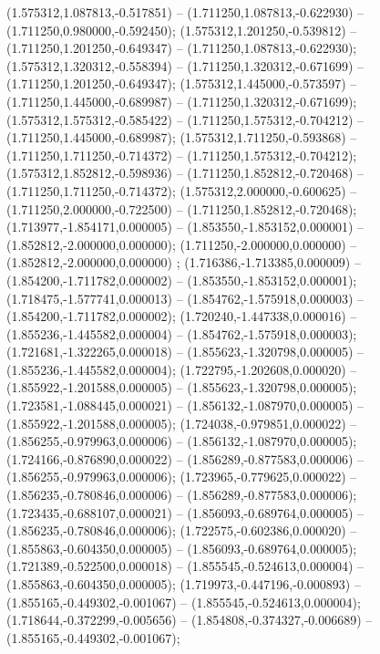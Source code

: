  (1.575312,1.087813,-0.517851) -- (1.711250,1.087813,-0.622930) -- (1.711250,0.980000,-0.592450);
 (1.575312,1.201250,-0.539812) -- (1.711250,1.201250,-0.649347) -- (1.711250,1.087813,-0.622930);
 (1.575312,1.320312,-0.558394) -- (1.711250,1.320312,-0.671699) -- (1.711250,1.201250,-0.649347);
 (1.575312,1.445000,-0.573597) -- (1.711250,1.445000,-0.689987) -- (1.711250,1.320312,-0.671699);
 (1.575312,1.575312,-0.585422) -- (1.711250,1.575312,-0.704212) -- (1.711250,1.445000,-0.689987);
 (1.575312,1.711250,-0.593868) -- (1.711250,1.711250,-0.714372) -- (1.711250,1.575312,-0.704212);
 (1.575312,1.852812,-0.598936) -- (1.711250,1.852812,-0.720468) -- (1.711250,1.711250,-0.714372);
 (1.575312,2.000000,-0.600625) -- (1.711250,2.000000,-0.722500) -- (1.711250,1.852812,-0.720468);
 (1.713977,-1.854171,0.000005) -- (1.853550,-1.853152,0.000001) -- (1.852812,-2.000000,0.000000);
 (1.711250,-2.000000,0.000000) -- (1.852812,-2.000000,0.000000) ;
 (1.716386,-1.713385,0.000009) -- (1.854200,-1.711782,0.000002) -- (1.853550,-1.853152,0.000001);
 (1.718475,-1.577741,0.000013) -- (1.854762,-1.575918,0.000003) -- (1.854200,-1.711782,0.000002);
 (1.720240,-1.447338,0.000016) -- (1.855236,-1.445582,0.000004) -- (1.854762,-1.575918,0.000003);
 (1.721681,-1.322265,0.000018) -- (1.855623,-1.320798,0.000005) -- (1.855236,-1.445582,0.000004);
 (1.722795,-1.202608,0.000020) -- (1.855922,-1.201588,0.000005) -- (1.855623,-1.320798,0.000005);
 (1.723581,-1.088445,0.000021) -- (1.856132,-1.087970,0.000005) -- (1.855922,-1.201588,0.000005);
 (1.724038,-0.979851,0.000022) -- (1.856255,-0.979963,0.000006) -- (1.856132,-1.087970,0.000005);
 (1.724166,-0.876890,0.000022) -- (1.856289,-0.877583,0.000006) -- (1.856255,-0.979963,0.000006);
 (1.723965,-0.779625,0.000022) -- (1.856235,-0.780846,0.000006) -- (1.856289,-0.877583,0.000006);
 (1.723435,-0.688107,0.000021) -- (1.856093,-0.689764,0.000005) -- (1.856235,-0.780846,0.000006);
 (1.722575,-0.602386,0.000020) -- (1.855863,-0.604350,0.000005) -- (1.856093,-0.689764,0.000005);
 (1.721389,-0.522500,0.000018) -- (1.855545,-0.524613,0.000004) -- (1.855863,-0.604350,0.000005);
 (1.719973,-0.447196,-0.000893) -- (1.855165,-0.449302,-0.001067) -- (1.855545,-0.524613,0.000004);
 (1.718644,-0.372299,-0.005656) -- (1.854808,-0.374327,-0.006689) -- (1.855165,-0.449302,-0.001067);
